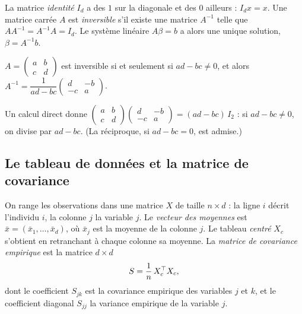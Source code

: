 \begin{definition}
La matrice \emph{identité} $I_d$ a des $1$ sur la diagonale et des $0$ ailleurs : $I_dx=x$.
Une matrice carrée $A$ est \emph{inversible} s'il existe une matrice $A^{-1}$ telle que $AA^{-1}=A^{-1}A=I_d$.
Le système linéaire $A\beta=b$ a alors une unique solution, $\beta=A^{-1}b$.
\end{definition}

\begin{proposition}
$A=\begin{pmatrix}a&b\\c&d\end{pmatrix}$ est inversible si et seulement si $ad-bc\ne0$, et alors
$A^{-1}=\dfrac{1}{ad-bc}\begin{pmatrix}d&-b\\-c&a\end{pmatrix}$.
\end{proposition}
\begin{preuve}
Un calcul direct donne $\begin{pmatrix}a&b\\c&d\end{pmatrix}\begin{pmatrix}d&-b\\-c&a\end{pmatrix}=(ad-bc)\,I_2$ : si $ad-bc\ne0$, on divise par $ad-bc$.
(La réciproque, si $ad-bc=0$, est admise.)
\end{preuve}

\subsection{Le tableau de données et la matrice de covariance}

\begin{definition}
On range les observations dans une matrice $X$ de taille $n\times d$ : la ligne $i$ décrit l'individu $i$, la colonne $j$ la variable $j$.
Le \emph{vecteur des moyennes} est $\bar x=(\bar x_1,\dots,\bar x_d)$, où $\bar x_j$ est la moyenne de la colonne $j$.
Le tableau \emph{centré} $X_c$ s'obtient en retranchant à chaque colonne sa moyenne.
La \emph{matrice de covariance empirique} est la matrice $d\times d$
\[
  S=\frac1n\,X_c^{\top} X_c ,
\]
dont le coefficient $S_{jk}$ est la covariance empirique des variables $j$ et $k$, et le coefficient diagonal $S_{jj}$ la variance empirique de la variable $j$.
\end{definition}

